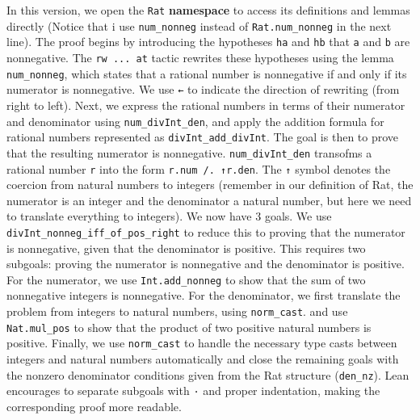 \begin{example}
\begin{lstlisting}[language=lean]
\end{lstlisting}
In this version, we open the 
\lstinline[language=lean]|Rat| \textbf{namespace} to access its definitions and lemmas directly 
(Notice that i use \lstinline[language=lean]|num_nonneg| instead of 
\lstinline[language=lean]|Rat.num_nonneg| in the next line).
The proof begins by introducing the hypotheses \lstinline[language=lean]|ha| and \lstinline[language=lean]|hb|
that \lstinline[language=lean]|a| and \lstinline[language=lean]|b| are nonnegative.
The \lstinline[language=lean]|rw ... at| tactic rewrites these hypotheses using the lemma
\lstinline[language=lean]|num_nonneg|, which states that a rational number
is nonnegative if and only if its numerator is nonnegative. 
We use \lstinline[language=lean]|←| to indicate the direction of rewriting (from right to left).
Next, we express the rational numbers in terms of their numerator and denominator using
\lstinline[language=lean]|num_divInt_den|, and apply the addition formula
for rational numbers represented as \lstinline[language=lean]|divInt_add_divInt|.
The goal is then to prove that the resulting numerator is nonnegative.
\lstinline[language=lean]|num_divInt_den| transofms a rational number \lstinline[language=lean]|r| 
into the form \lstinline[language=lean]|r.num /. ↑r.den|. The \lstinline[language=lean]|↑| symbol denotes
the coercion from natural numbers to integers 
(remember in our definition of Rat, the numerator is an integer and the denominator a natural number, 
but here we need to translate everything to integers). 
We now have 3 goals.
We use \lstinline[language=lean]|divInt_nonneg_iff_of_pos_right| to reduce this to proving that the 
numerator is nonnegative, given that the denominator is positive.
This requires two subgoals: proving the numerator is nonnegative and the denominator is positive.
For the numerator, we use \lstinline[language=lean]|Int.add_nonneg|
to show that the sum of two nonnegative integers is nonnegative.
For the denominator, we first translate the problem from integers to natural numbers, using \lstinline[language=lean]|norm_cast|.
and use \lstinline[language=lean]|Nat.mul_pos| to show that the product of two positive natural numbers is positive.
Finally, we use \lstinline[language=lean]|norm_cast| to handle the necessary type casts between integers 
and natural numbers automatically and close the remaining goals with the 
nonzero denominator conditions given from the Rat structure (\lstinline[language=lean]|den_nz|).
Lean encourages to separate subgoals with \lstinline[language=lean]|·| and proper indentation, 
making the corresponding proof more readable.
\end{example}
